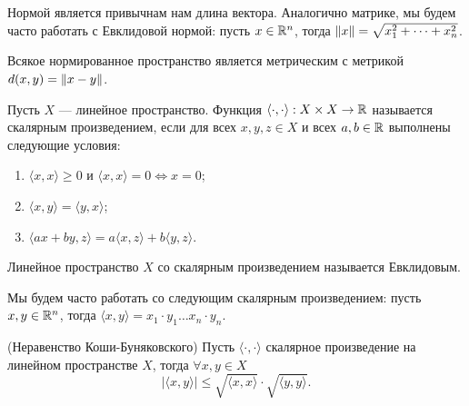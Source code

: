 \documentclass[a4paper]{article}
\theoremstyle{named}
\begin{document}
        Нормой является привычнам нам длина вектора. Аналогично матрике, мы будем часто работать с Евклидовой нормой: пусть $x \in \mathbb{R}^n$, тогда $\left\lVert x\right\rVert = \sqrt{x_1^2 + \dots + x_n^2}$.

        Всякое нормированное пространство является метрическим с метрикой $d(x, y) = \left\lVert x - y\right\rVert$.

        \begin{definition*}
            Пусть $X$ --- линейное пространство. Функция $\langle \cdot, \cdot \rangle: X \times X \to \mathbb{R}$ называется скалярным произведением, если для всех $x, y, z \in X$ и всех $a, b \in \mathbb{R}$ выполнены следующие условия:
            \begin{enumerate}
            \item $\langle x, x \rangle \geq 0$ и $\langle x, x \rangle = 0 \iff x = 0$;
            \item $\langle x, y \rangle = \langle y, x \rangle$;
            \item $\langle ax + by, z \rangle = a \langle x, z \rangle + b \langle y, z \rangle$.
            \end{enumerate}

            Линейное пространство $X$ со скалярным произведением называется Евклидовым.
        \end{definition*}

        Мы будем часто работать со следующим скалярным произведением: пусть $x, y \in \mathbb{R}^n$, тогда $\langle x, y \rangle = x_1 \cdot y_1 \dots x_n \cdot y_n$.

        \begin{lemma*} (Неравенство Коши-Буняковского) 
            Пусть $\langle \cdot, \cdot \rangle$ скалярное произведение на линейном пространстве $X$, тогда $\forall x, y \in X$
            \begin{equation*}
                |\langle x, y \rangle| \leq \sqrt{\langle x, x \rangle} \cdot \sqrt{\langle y, y \rangle}.
            \end{equation*}
        \end{lemma*}
        
\end{document}
